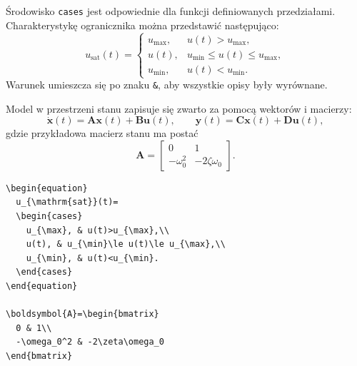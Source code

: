 \section{}

Środowisko \texttt{cases} jest odpowiednie dla funkcji definiowanych przedziałami.
Charakterystykę ogranicznika można przedstawić następująco:
\begin{equation}
  u_{\mathrm{sat}}(t)=
  \begin{cases}
    u_{\max}, & u(t)>u_{\max},\\
    u(t), & u_{\min}\le u(t)\le u_{\max},\\
    u_{\min}, & u(t)<u_{\min}.
  \end{cases}
  \label{eq:ogranicznik}
\end{equation}
Warunek umieszcza się po znaku \verb|&|, aby wszystkie opisy były wyrównane.

Model w przestrzeni stanu zapisuje się zwarto za pomocą wektorów i macierzy:
\begin{equation}
  \dot{\boldsymbol{x}}(t)
    = \boldsymbol{A}\boldsymbol{x}(t)+\boldsymbol{B}\boldsymbol{u}(t),
  \qquad
  \boldsymbol{y}(t)
    = \boldsymbol{C}\boldsymbol{x}(t)+\boldsymbol{D}\boldsymbol{u}(t),
  \label{eq:model-stanu}
\end{equation}
gdzie przykładowa macierz stanu ma postać
\begin{equation}
  \boldsymbol{A}=
  \begin{bmatrix}
    0 & 1\\
    -\omega_0^2 & -2\zeta\omega_0
  \end{bmatrix}.
  \label{eq:macierz-stanu}
\end{equation}

\begin{lstlisting}[style=thesis,caption={Kod definicji przedziałowej i macierzy},label={lst:rownania-cases-matrix}]
\begin{equation}
  u_{\mathrm{sat}}(t)=
  \begin{cases}
    u_{\max}, & u(t)>u_{\max},\\
    u(t), & u_{\min}\le u(t)\le u_{\max},\\
    u_{\min}, & u(t)<u_{\min}.
  \end{cases}
\end{equation}

\boldsymbol{A}=\begin{bmatrix}
  0 & 1\\
  -\omega_0^2 & -2\zeta\omega_0
\end{bmatrix}
\end{lstlisting}

